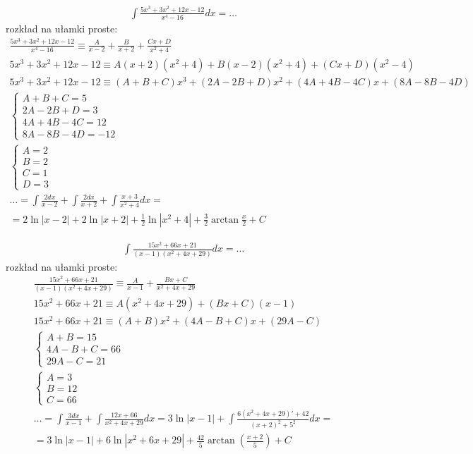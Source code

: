 \begin{gather*}\int \frac{5x^3+3x^2+12x-12}{x^4-16}dx=\ldots\end{gather*}
rozkład na ułamki proste:
\begin{gather*}\frac{5x^3+3x^2+12x-12}{x^4-16} \equiv \frac{A}{x-2}+\frac{B}{x+2}+\frac{Cx+D}{x^2+4} \\
5x^3+3x^2+12x-12 \equiv A(x+2)(x^2+4)+B(x-2)(x^2+4)+(Cx+D)(x^2-4) \\
5x^3+3x^2+12x-12 \equiv (A+B+C)x^3+(2A-2B+D)x^2+(4A+4B-4C)x+(8A-8B-4D) \\
\begin{cases} A+B+C=5 \\ 2A-2B+D=3 \\ 4A+4B-4C=12 \\ 8A-8B-4D=-12 \end{cases} \\
\begin{cases} A=2 \\ B=2 \\ C=1 \\ D=3 \end{cases} \\
\ldots = \int \frac{2dx}{x-2}+\int \frac{2dx}{x+2}+\int \frac{x+3}{x^2+4}dx = \\
= 2\ln|x-2|+2\ln|x+2|+\frac{1}{2}\ln|x^2+4|+\frac{3}{2}\arctan \frac{x}{2}+C\end{gather*}



\begin{gather*}\int \frac{15x^2+66x+21}{(x-1)(x^2+4x+29)}dx=\ldots\end{gather*}
rozkład na ułamki proste:
\begin{gather*}\frac{15x^2+66x+21}{(x-1)(x^2+4x+29)} \equiv \frac{A}{x-1}+\frac{Bx+C}{x^2+4x+29} \\
15x^2+66x+21 \equiv A(x^2+4x+29)+(Bx+C)(x-1) \\
15x^2+66x+21 \equiv (A+B)x^2+(4A-B+C)x+(29A-C) \\
\begin{cases} A+B=15 \\ 4A-B+C=66 \\ 29A-C=21 \end{cases} \\
\begin{cases} A=3 \\ B=12 \\ C=66 \end{cases} \\
\ldots = \int \frac{3dx}{x-1} + \int \frac{12x+66}{x^2+4x+29}dx = 3\ln|x-1| + \int \frac{6(x^2+4x+29)'+42}{(x+2)^2+5^2}dx = \\
= 3\ln|x-1|+6\ln|x^2+6x+29|+\frac{42}{5}\arctan \left(\frac{x+2}{5}\right)+C\end{gather*}


